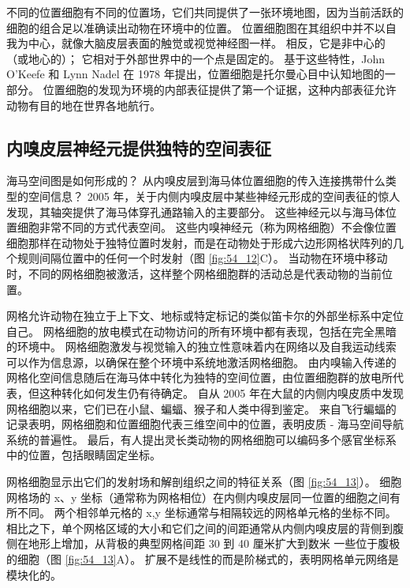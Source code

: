 不同的位置细胞有不同的位置场，它们共同提供了一张环境地图，因为当前活跃的细胞的组合足以准确读出动物在环境中的位置。
位置细胞图在其组织中并不以自我为中心，就像大脑皮层表面的触觉或视觉神经图一样。
相反，它是非中心的（或地心的）； 它相对于外部世界中的一个点是固定的。
基于这些特性，John O’Keefe 和 Lynn Nadel 在 1978 年提出，位置细胞是托尔曼心目中认知地图的一部分。
位置细胞的发现为环境的内部表征提供了第一个证据，这种内部表征允许动物有目的地在世界各地航行。



\subsection{内嗅皮层神经元提供独特的空间表征}

海马空间图是如何形成的？
从内嗅皮层到海马体位置细胞的传入连接携带什么类型的空间信息？
2005 年，关于内侧内嗅皮层中某些神经元形成的空间表征的惊人发现，其轴突提供了海马体穿孔通路输入的主要部分。
这些神经元以与海马体位置细胞非常不同的方式代表空间。
这些内嗅神经元（称为网格细胞）不会像位置细胞那样在动物处于独特位置时发射，而是在动物处于形成六边形网格状阵列的几个规则间隔位置中的任何一个时发射（图 \ref{fig:54_12}C）。
当动物在环境中移动时，不同的网格细胞被激活，这样整个网格细胞群的活动总是代表动物的当前位置。


网格允许动物在独立于上下文、地标或特定标记的类似笛卡尔的外部坐标系中定位自己。
网格细胞的放电模式在动物访问的所有环境中都有表现，包括在完全黑暗的环境中。
网格细胞激发与视觉输入的独立性意味着内在网络以及自我运动线索可以作为信息源，以确保在整个环境中系统地激活网格细胞。
由内嗅输入传递的网格化空间信息随后在海马体中转化为独特的空间位置，由位置细胞群的放电所代表，但这种转化如何发生仍有待确定。
自从 2005 年在大鼠的内侧内嗅皮质中发现网格细胞以来，它们已在小鼠、蝙蝠、猴子和人类中得到鉴定。
来自飞行蝙蝠的记录表明，网格细胞和位置细胞代表三维空间中的位置，表明皮质 - 海马空间导航系统的普遍性。
最后，有人提出灵长类动物的网格细胞可以编码多个感官坐标系中的位置，包括眼睛固定坐标。


网格细胞显示出它们的发射场和解剖组织之间的特征关系（图 \ref{fig:54_13}）。
细胞网格场的 x、y 坐标（通常称为网格相位）在内侧内嗅皮层同一位置的细胞之间有所不同。
两个相邻单元格的 x,y 坐标通常与相隔较远的网格单元格的坐标不同。
相比之下，单个网格区域的大小和它们之间的间距通常从内侧内嗅皮层的背侧到腹侧在地形上增加，从背极的典型网格间距 30 到 40 厘米扩大到数米 一些位于腹极的细胞（图 \ref{fig:54_13}A）。
扩展不是线性的而是阶梯式的，表明网格单元网络是模块化的。


